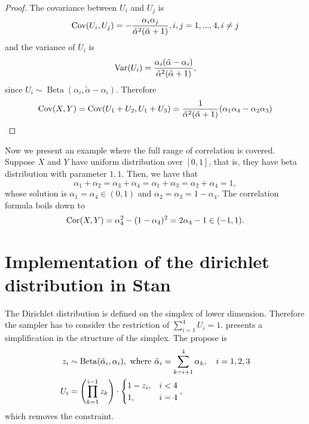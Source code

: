\begin{proof}

  The covariance between $U_i$ and $U_j$ is \cite[p. 11]{lin2016dirichlet} 
\begin{equation}
  \operatorname{Cov}(U_i, U_j) = - \frac{\alpha_i\alpha_j}{\tilde{\alpha}^2(\tilde{\alpha}+1)}, i,j = 1,...,4, i \neq j
\end{equation} 
and the variance of $U_i$ is 
\begin{equation}
  \operatorname{Var}(U_i) = \frac{\alpha_i(\tilde{\alpha}-\alpha_i)}{\tilde{\alpha}^2(\tilde{\alpha}+1)},
\end{equation}
since $U_i \sim \operatorname{Beta}(\alpha_i, \tilde{\alpha} -\alpha_i)$.
Therefore 
\begin{equation}
  \operatorname{Cov}(X,Y) = \operatorname{Cov}(U_1+U_2, U_1+U_3) = \frac{1}{\tilde{\alpha}^2(\tilde{\alpha}+1)}(\alpha_1\alpha_4 - \alpha_2\alpha_3)
\end{equation}
  
\end{proof}

Now we present an example where the full range of correlation is covered.
Suppose $X$ and $Y$ have uniform distribution over $[0,1]$, that is, they have
beta distribution with parameter $1,1$. Then, we have that 
$$\alpha_1 +
\alpha_2 = \alpha_3 + \alpha_4 = \alpha_1 + \alpha_3 = \alpha_2 + \alpha_4 = 1,$$
whose solution is $\alpha_1 = \alpha_4 \in (0,1)$ and $\alpha_2 = \alpha_3 = 1
- \alpha_4$. The correlation formula boils down to 
$$\operatorname{Cor}(X,Y) = \alpha_4^2 - (1 - \alpha_4)^2 = 2\alpha_4 - 1 \in (-1,1).$$

\section{Implementation of the dirichlet distribution in Stan}

The Dirichlet distribution is defined on the simplex of lower dimension.
Therefore the sampler has to consider the restriction of $\sum_{i=1}^4 U_i =
  1$. \textcite{betancourt2012cruising} presents a simplification in the
structure of the simplex. The propose is \cite[p. 2]{betancourt2012cruising}
\begin{equation*}
  \begin{aligned}
    z_i & \sim \operatorname{Beta}(\tilde{\alpha}_i, \alpha_i), \text{ where } \tilde{\alpha}_i = \sum_{k=i+1}^4 \alpha_k, \quad i = 1,2,3 \\
    U_i & = \left(\prod_{k=1}^{i-1} z_k\right)\cdot \begin{cases}
      1 - z_i, & i < 4 \\
      1,       & i = 4
    \end{cases},
  \end{aligned}
\end{equation*}
which removes the constraint.

